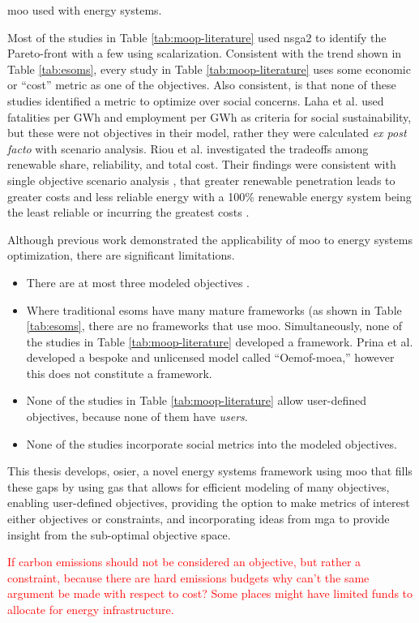 \begin{table}[ht!]
    \centering
    \caption{\ac{moo} used with energy systems.}
    \label{tab:moop-literature}
    \resizebox*{\textwidth}{!}{}
\end{table}
Most of the studies in Table \ref{tab:moop-literature} used \ac{nsga2} to identify
the Pareto-front with a few using scalarization.
Consistent with the trend shown in Table \ref{tab:esoms}, every study in Table 
\ref{tab:moop-literature} uses some economic or ``cost'' metric as one of the 
objectives. Also consistent, is that none of these studies identified a metric to 
optimize over social concerns. Laha et al. \cite{laha_low_2021} used fatalities per 
GWh and employment per GWh as criteria for social sustainability, but these were not
objectives in their model, rather they were calculated \textit{ex post facto}
with scenario analysis. Riou et al. \cite{riou_multi-objective_2021} investigated
the tradeoffs among renewable share, reliability, and total cost. Their findings were
consistent with single objective scenario analysis \cite{de_sisternes_value_2016},
that greater renewable penetration leads to greater costs and less reliable energy 
with a 100\% renewable energy system being the least reliable or incurring the 
greatest costs \cite{riou_multi-objective_2021}. 

Although previous work demonstrated the applicability of \ac{moo} to energy systems
optimization, there are significant limitations. 
\begin{itemize}
    \item{There are at most three modeled objectives \cite{riou_multi-objective_2021,de-leon_almaraz_deployment_2015, de-leon_almaraz_assessment_2013}.}
    \item{Where traditional \acp{esom} have many mature frameworks (as shown in Table \ref{tab:esoms}, there are no frameworks that use \ac{moo}. Simultaneously, none of the studies in Table \ref{tab:moop-literature} developed a framework. Prina et al. developed a bespoke and unlicensed model called ``Oemof-moea,'' however this does not constitute a framework.}
    \item{None of the studies in Table \ref{tab:moop-literature} allow user-defined objectives, because none of them have \textit{users}.}
    \item{None of the studies incorporate social metrics into the modeled objectives.}
\end{itemize}

This thesis develops, \ac{osier}, a novel energy systems framework using \ac{moo} 
that fills these gaps by using \acp{ga} that allows for efficient modeling of many 
objectives, enabling user-defined objectives, providing the option to make metrics 
of interest either objectives or constraints, and incorporating ideas from \ac{mga} 
to provide insight from the sub-optimal objective space.


\textcolor{red}{If carbon emissions should not be considered an objective, but rather a constraint, because there are hard emissions budgets why can't the same argument be made with respect to cost? Some places might have limited funds to allocate for energy infrastructure. }